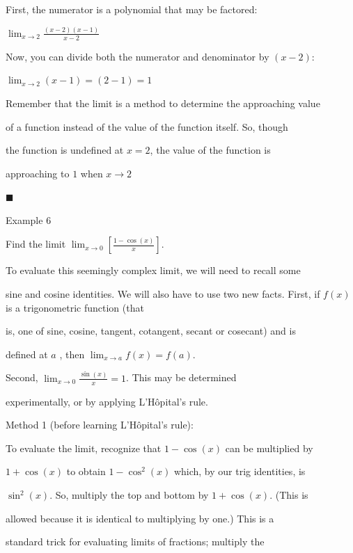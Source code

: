 First, the numerator is a polynomial that may be factored:

$\lim_{x\to2}\frac{(x-2)(x-1)}{x-2}$



Now, you can divide both the numerator and denominator by $(x-2)$:

$\lim_{x\to2}(x-1)=(2-1)=1$



Remember that the limit is a method to determine the approaching value

of a function instead of the value of the function itself. So, though

the function is undefined at $x=2$, the value of the function is

approaching to $1$ when $x \rightarrow 2$



$\blacksquare$



Example 6



Find the limit $\lim_{x\to0}\left[\frac{1-\cos(x)}{x}\right]$.



To evaluate this seemingly complex limit, we will need to recall some

sine and cosine identities. We will also have to use two new facts. First, if $f(x)$ is a trigonometric function (that

is, one of sine, cosine, tangent, cotangent, secant or cosecant) and is

defined at $a$ , then $\lim_{x\to a}f(x)=f(a)$.



Second, $\lim_{x\to 0}\frac{\sin(x)}{x}=1$. This may be determined

experimentally, or by applying L'Hôpital's rule.



Method 1 (before learning L'Hôpital's rule):



To evaluate the limit, recognize that $1-\cos(x)$ can be multiplied by

$1+\cos(x)$ to obtain $1-\cos^2(x)$ which, by our trig identities, is

$\sin^2(x)$. So, multiply the top and bottom by $1+\cos(x)$. (This is

allowed because it is identical to multiplying by one.) This is a

standard trick for evaluating limits of fractions; multiply the

